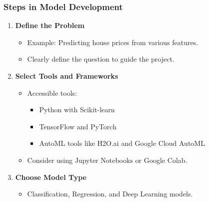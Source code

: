 \documentclass[aspectratio=169]{beamer}
\begin{document}
\begin{frame}[fragile]
    \frametitle{Steps in Model Development}
    \begin{enumerate}
        \item \textbf{Define the Problem}
        \begin{itemize}
            \item Example: Predicting house prices from various features.
            \item Clearly define the question to guide the project.
        \end{itemize}

        \item \textbf{Select Tools and Frameworks}
        \begin{itemize}
            \item Accessible tools: 
            \begin{itemize}
                \item Python with Scikit-learn
                \item TensorFlow and PyTorch
                \item AutoML tools like H2O.ai and Google Cloud AutoML
            \end{itemize}
            \item Consider using Jupyter Notebooks or Google Colab.
        \end{itemize}
        
        \item \textbf{Choose Model Type}
        \begin{itemize}
            \item Classification, Regression, and Deep Learning models.
        \end{itemize}
    \end{enumerate}
\end{frame}
\end{document}
